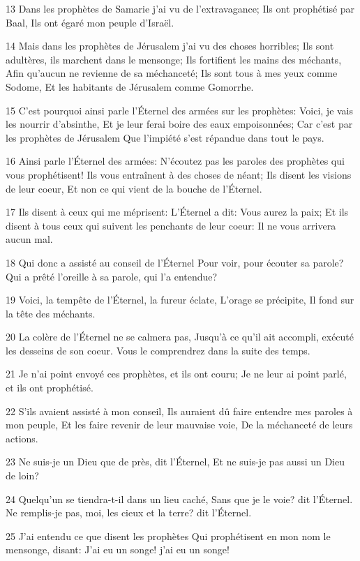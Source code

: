 \par 13 Dans les prophètes de Samarie j'ai vu de l'extravagance; Ils ont prophétisé par Baal, Ils ont égaré mon peuple d'Israël.
\par 14 Mais dans les prophètes de Jérusalem j'ai vu des choses horribles; Ils sont adultères, ils marchent dans le mensonge; Ils fortifient les mains des méchants, Afin qu'aucun ne revienne de sa méchanceté; Ils sont tous à mes yeux comme Sodome, Et les habitants de Jérusalem comme Gomorrhe.
\par 15 C'est pourquoi ainsi parle l'Éternel des armées sur les prophètes: Voici, je vais les nourrir d'absinthe, Et je leur ferai boire des eaux empoisonnées; Car c'est par les prophètes de Jérusalem Que l'impiété s'est répandue dans tout le pays.
\par 16 Ainsi parle l'Éternel des armées: N'écoutez pas les paroles des prophètes qui vous prophétisent! Ils vous entraînent à des choses de néant; Ils disent les visions de leur coeur, Et non ce qui vient de la bouche de l'Éternel.
\par 17 Ils disent à ceux qui me méprisent: L'Éternel a dit: Vous aurez la paix; Et ils disent à tous ceux qui suivent les penchants de leur coeur: Il ne vous arrivera aucun mal.
\par 18 Qui donc a assisté au conseil de l'Éternel Pour voir, pour écouter sa parole? Qui a prêté l'oreille à sa parole, qui l'a entendue?
\par 19 Voici, la tempête de l'Éternel, la fureur éclate, L'orage se précipite, Il fond sur la tête des méchants.
\par 20 La colère de l'Éternel ne se calmera pas, Jusqu'à ce qu'il ait accompli, exécuté les desseins de son coeur. Vous le comprendrez dans la suite des temps.
\par 21 Je n'ai point envoyé ces prophètes, et ils ont couru; Je ne leur ai point parlé, et ils ont prophétisé.
\par 22 S'ils avaient assisté à mon conseil, Ils auraient dû faire entendre mes paroles à mon peuple, Et les faire revenir de leur mauvaise voie, De la méchanceté de leurs actions.
\par 23 Ne suis-je un Dieu que de près, dit l'Éternel, Et ne suis-je pas aussi un Dieu de loin?
\par 24 Quelqu'un se tiendra-t-il dans un lieu caché, Sans que je le voie? dit l'Éternel. Ne remplis-je pas, moi, les cieux et la terre? dit l'Éternel.
\par 25 J'ai entendu ce que disent les prophètes Qui prophétisent en mon nom le mensonge, disant: J'ai eu un songe! j'ai eu un songe!
